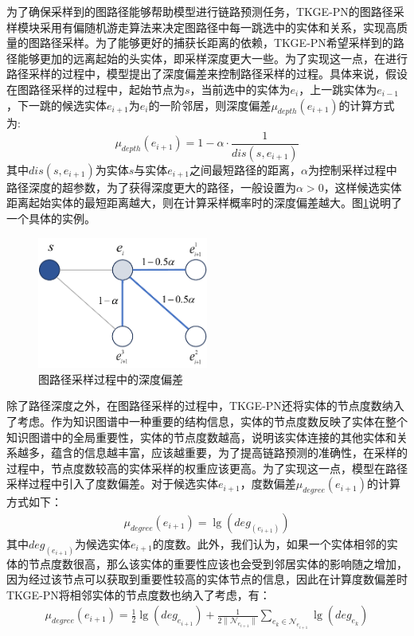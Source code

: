 为了确保采样到的图路径能够帮助模型进行链路预测任务，TKGE-PN的图路径采样模块采用有偏随机游走算法来决定图路径中每一跳选中的实体和关系，实现高质量的图路径采样。为了能够更好的捕获长距离的依赖，TKGE-PN希望采样到的路径能够更加的远离起始的头实体，即采样深度更大一些。为了实现这一点，在进行路径采样的过程中，模型提出了深度偏差来控制路径采样的过程。具体来说，假设在图路径采样的过程中，起始节点为$s$，当前选中的实体为$e_i$，上一跳实体为$e_{i-1}$，下一跳的候选实体$e_{i+1}$为$e_i$的一阶邻居，则深度偏差$\mu_{depth}(e_{i+1})$的计算方式为:
\begin{equation}
  \mu_{depth}(e_{i+1})=1-\alpha\cdot\frac{1}{dis(s,e_{i+1})}
\end{equation}
其中$dis(s,e_{i+1})$为实体$s$与实体$e_{i+1}$之间最短路径的距离，$\alpha$为控制采样过程中路径深度的超参数，为了获得深度更大的路径，一般设置为$\alpha>0$，这样候选实体距离起始实体的最短距离越大，则在计算采样概率时的深度偏差越大。图\ref{depth_bias}说明了一个具体的实例。

\begin{figure}[htbp]
  \centerline{\includegraphics[width=0.5\textwidth]{pic/depth_bias.pdf}}
  \caption{图路径采样过程中的深度偏差}
  \label{depth_bias}
\end{figure}

除了路径深度之外，在图路径采样的过程中，TKGE-PN还将实体的节点度数纳入了考虑。作为知识图谱中一种重要的结构信息，实体的节点度数反映了实体在整个知识图谱中的全局重要性，实体的节点度数越高，说明该实体连接的其他实体和关系越多，蕴含的信息越丰富，应该越重要，为了提高链路预测的准确性，在采样的过程中，节点度数较高的实体采样的权重应该更高。为了实现这一点，模型在路径采样过程中引入了度数偏差。对于候选实体$e_{i+1}$，度数偏差$\mu_{degree}(e_{i+1})$的计算方式如下：
\begin{gather}
  \mu_{degree}(e_{i+1})=\lg(deg_{(e_{i+1})})
\end{gather}
其中$deg_{(e_{i+1})}$为候选实体$e_{i+1}$的度数。此外，我们认为，如果一个实体相邻的实体的节点度数很高，那么该实体的重要性应该也会受到邻居实体的影响随之增加，因为经过该节点可以获取到重要性较高的实体节点的信息，因此在计算度数偏差时TKGE-PN将相邻实体的节点度数也纳入了考虑，有：
\begin{gather}
  \mu_{degree}(e_{i+1})=\frac{1}{2}\lg(deg_{e_{i+1}})+\frac{1}{2\|\mathcal{N}_{e_{i+1}}\|}\sum_{e_k\in\mathcal{N}_{e_{i+1}}}\lg(deg_{e_k})
\end{gather}

